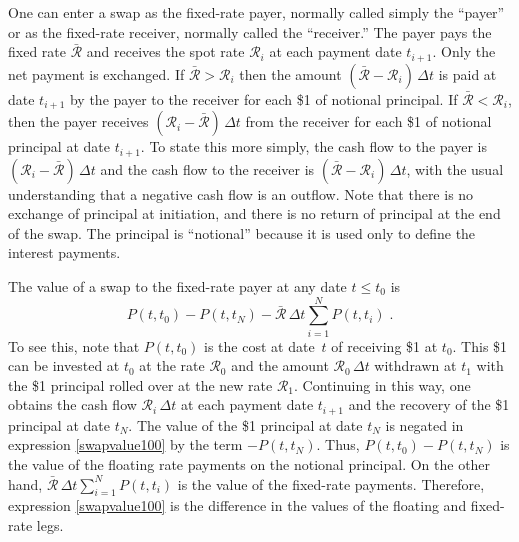 One can enter a swap as the fixed-rate payer, normally called simply the ``payer''   or as the fixed-rate receiver, normally called  the ``receiver.''   The payer pays the fixed rate $\bar{\mathcal{R}}$ and receives the spot rate $\mathcal{R}_i$  at each payment date $t_{i+1}$.  Only the net payment is exchanged.  If $\bar{\mathcal{R}} > \mathcal{R}_i$ then the amount $(\bar{\mathcal{R}}-\mathcal{R}_i)\,\varDelta t$ is paid at date $t_{i+1}$ by the payer to the receiver for each \$1 of notional principal.  If $\bar{\mathcal{R}} <  \mathcal{R}_i$, then the payer receives $(\mathcal{R}_i - \bar{\mathcal{R}})\,\varDelta t$ from the receiver for each \$1 of notional principal at date $t_{i+1}$.  To state this more simply, the cash flow to the payer is $(\mathcal{R}_i - \bar{\mathcal{R}})\,\varDelta t$ and the cash flow to the receiver is $(\bar{\mathcal{R}}-\mathcal{R}_i)\,\varDelta t$, with the usual understanding that a negative cash flow is an outflow.  Note that there is no exchange of principal at initiation, and there is no return of principal at the end of the swap.  The principal is ``notional''  because it is used only to define the interest payments.


The value of a swap to the fixed-rate payer at any date $t \leq t_0$ is
\begin{equation}\label{swapvalue100}
P(t,t_0) - P(t,t_N) - \bar{\mathcal{R}}\,\varDelta t\sum_{i=1}^N P(t,t_i)\;.
\end{equation}
To see this, note that $P(t,t_0)$ is the cost at date~$t$ of receiving \$1 at $t_0$.  This \$1 can be invested at $t_0$ at the rate $\mathcal{R}_0$ and the amount $\mathcal{R}_0 \,\varDelta t$ withdrawn at $t_1$ with the \$1 principal  rolled over at the new rate $\mathcal{R}_1$.  Continuing in this way, one obtains the cash flow $\mathcal{R}_i\,\varDelta t$ at each payment date $t_{i+1}$ and the recovery of the \$1 principal at date $t_N$.  The value of the \$1 principal at date $t_N$ is negated in expression \eqref{swapvalue100} by the term 
$-P(t,t_N)$.  Thus, $P(t,t_0)-P(t,t_N)$ is the value of the floating rate payments on the notional principal.  On the other hand, $\bar{\mathcal{R}}\,\varDelta t\sum_{i=1}^N P(t,t_i)$ is the value of the fixed-rate payments.  Therefore, expression \eqref{swapvalue100} is the difference in the values of the floating and fixed-rate legs.  

